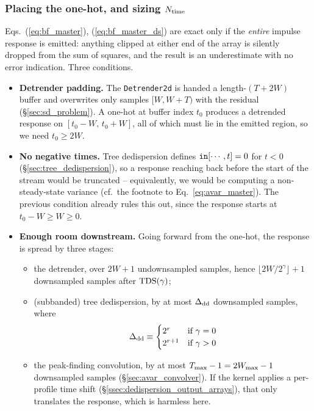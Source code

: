\documentclass{article}
\numberwithin{equation}{section}   %
\def\TDS{{\rm TDS}}
\begin{document}
\subsubsection{Placing the one-hot, and sizing $N_{\rm time}$}
\label{sssec:bf_sizing}

Eqs.\ (\ref{eq:bf_master}), (\ref{eq:bf_master_ds}) are exact only if the {\em entire} impulse
response is emitted: anything clipped at either end of the array is silently dropped from the sum
of squares, and the result is an underestimate with no error indication. Three conditions.

\begin{itemize}

\item {\bf Detrender padding.} The {\tt Detrender2d} is handed a length-$(T+2W)$ buffer and
overwrites only samples $[W, W+T)$ with the residual (\S\ref{sec:sd_problem}). A one-hot at buffer
index $t_0$ produces a detrended response on $[t_0-W,\, t_0+W]$, all of which must lie in the
emitted region, so we need $t_0 \ge 2W$.

\item {\bf No negative times.} Tree dedispersion defines ${\tt in}[\cdots,t] = 0$ for $t<0$
(\S\ref{sec:tree_dedispersion}), so a response reaching back before the start of the stream would
be truncated -- equivalently, we would be computing a non-steady-state variance
(cf.\ the footnote to Eq.\ \ref{eq:avar_master}). The previous condition already rules this out,
since the response starts at $t_0 - W \ge W \ge 0$.

\item {\bf Enough room downstream.} Going forward from the one-hot, the response is spread by
three stages:
\begin{itemize}
\item the detrender, over $2W+1$ undownsampled samples, hence
$\lfloor 2W/2^\gamma \rfloor + 1$ downsampled samples after $\TDS(\gamma)$;
\item (subbanded) tree dedispersion, by at most $\Delta_{\rm dd}$ downsampled samples, where
\begin{equation}
\Delta_{\rm dd} \equiv \begin{cases} 2^r & \mbox{if } \gamma = 0 \\
                                     2^{r+1} & \mbox{if } \gamma > 0 \end{cases}
\label{eq:bf_ddspread}
\end{equation}
\item the peak-finding convolution, by at most $T_{\rm max} - 1 = 2W_{\rm max}-1$ downsampled
samples (\S\ref{sec:avar_convolver}). If the kernel applies a per-profile time shift
(\S\ref{ssec:dedispersion_output_arrays}), that only translates the response, which is harmless
here.
\end{itemize}
\end{itemize}
\end{document}
